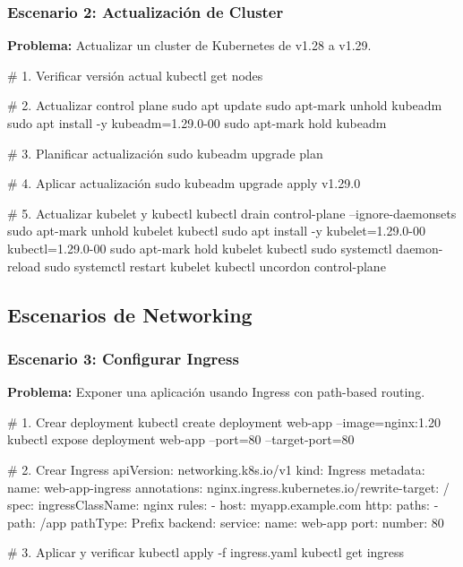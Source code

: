 \documentclass[11pt,a4paper]{article}
\begin{document}
\subsubsection{Escenario 2: Actualización de Cluster}

\textbf{Problema:} Actualizar un cluster de Kubernetes de v1.28 a v1.29.

\begin{commandbox}
\# 1. Verificar versión actual
kubectl get nodes

\# 2. Actualizar control plane
sudo apt update
sudo apt-mark unhold kubeadm
sudo apt install -y kubeadm=1.29.0-00
sudo apt-mark hold kubeadm

\# 3. Planificar actualización
sudo kubeadm upgrade plan

\# 4. Aplicar actualización
sudo kubeadm upgrade apply v1.29.0

\# 5. Actualizar kubelet y kubectl
kubectl drain control-plane --ignore-daemonsets
sudo apt-mark unhold kubelet kubectl
sudo apt install -y kubelet=1.29.0-00 kubectl=1.29.0-00
sudo apt-mark hold kubelet kubectl
sudo systemctl daemon-reload
sudo systemctl restart kubelet
kubectl uncordon control-plane
\end{commandbox}

\subsection{Escenarios de Networking}

\subsubsection{Escenario 3: Configurar Ingress}

\textbf{Problema:} Exponer una aplicación usando Ingress con path-based routing.

\begin{commandbox}
\# 1. Crear deployment
kubectl create deployment web-app --image=nginx:1.20
kubectl expose deployment web-app --port=80 --target-port=80

\# 2. Crear Ingress
apiVersion: networking.k8s.io/v1
kind: Ingress
metadata:
  name: web-app-ingress
  annotations:
    nginx.ingress.kubernetes.io/rewrite-target: /
spec:
  ingressClassName: nginx
  rules:
  - host: myapp.example.com
    http:
      paths:
      - path: /app
        pathType: Prefix
        backend:
          service:
            name: web-app
            port:
              number: 80

\# 3. Aplicar y verificar
kubectl apply -f ingress.yaml
kubectl get ingress
\end{commandbox}
\end{document}
